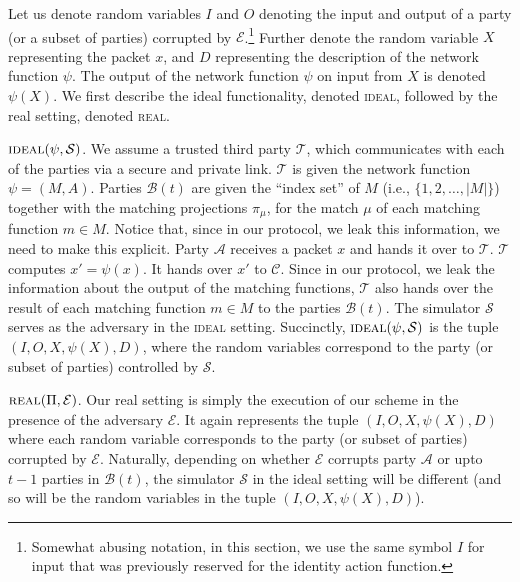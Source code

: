 \RequirePackage{fix-cm} \let\oldvec\vec \documentclass{sig-alternate-05-2015}
\begin{document}
Let us denote random variables $I$ and $O$ denoting the input and output of a party (or a subset of parties) corrupted by $\mathcal{E}$.\footnote{\small Somewhat abusing notation, in this section, we use the same symbol $I$ for input that was previously reserved for the identity action function.} Further denote the random variable $X$ representing the packet $x$, and $D$ representing the description of the network function $\psi$. The output of the network function $\psi$ on input from $X$ is denoted $\psi(X)$. We first describe the ideal functionality, denoted \textsc{ideal}, followed by the real setting, denoted \textsc{real}.

$\textsc{ideal}(\psi, \mathcal{S})$. We assume a trusted third party $\mathcal{T}$, which communicates with each of the parties via a secure and private link. $\mathcal{T}$ is given the network function $\psi = (M, A)$. Parties $\mathcal{B}(t)$ are given the ``index set'' of $M$ (i.e., $\{1, 2, \ldots, |M|\}$) together with the matching projections $\pi_\mu$, for the match $\mu$ of each matching function $m \in M$. Notice that, since in our protocol, we leak this information, we need to make this explicit. Party $\mathcal{A}$ receives a packet $x$ and hands it over to $\mathcal{T}$. $\mathcal{T}$ computes $x' = \psi(x)$. It hands over $x'$ to $\mathcal{C}$. Since in our protocol, we leak the information about the output of the matching functions, $\mathcal{T}$ also hands over the result of each matching function $m \in M$ to the parties $\mathcal{B}(t)$. The simulator $\mathcal{S}$ serves as the adversary in the \textsc{ideal} setting. Succinctly, $\textsc{ideal}(\psi, \mathcal{S})$ is the tuple $(I, O, X, \psi(X), D)$, where the random variables correspond to the party (or subset of parties) controlled by $\mathcal{S}$. 

$\textsc{real}(\Pi, \mathcal{E})$. Our real setting is simply the execution of our scheme in the presence of the adversary $\mathcal{E}$. It again represents the tuple $(I, O, X, \psi(X), D)$ where each random variable corresponds to the party (or subset of parties) corrupted by $\mathcal{E}$. Naturally, depending on whether $\mathcal{E}$ corrupts party $\mathcal{A}$ or upto $t-1$ parties in $\mathcal{B}(t)$, the simulator $\mathcal{S}$ in the ideal setting will be different (and so will be the random variables in the tuple $(I, O, X, \psi(X), D)$). 
\end{document}
